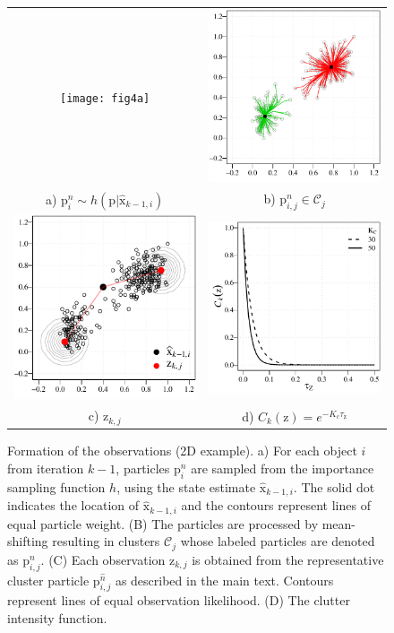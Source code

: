 \begin{figure}
	\centering
	\begin{tabular}{c@{\hspace{2em}}c}
		\texttt{[image: fig4a]} &
		\includegraphics[width=0.4\columnwidth]{fig4b} \\[-1ex]
		a) $\mathrm{p}_{i}^{n} \sim h(\mathrm{p} | \hat{\mathrm{x}}_{k-1,i})$ &
		b) $\mathrm{p}_{i,j}^n \in \mathscr{C}_j$ \\[3ex]
		\includegraphics[width=0.4\columnwidth]{fig4c} &
		\includegraphics[width=0.4\columnwidth]{fig4d} \\[-1ex]
		c) $\mathrm{z}_{k,j}$ &
		d) $C_k(\mathrm{z}) = e^{-K_c\tau_{\mathrm{z}}}$ 
	\end{tabular}
	\caption{Formation of the observations (2D example). a) For each object $i$ from iteration $k-1$, particles $\mathrm{p}_{i}^{n}$ are sampled from the importance sampling function $h$, using the state estimate $\hat{\mathrm{x}}_{k-1,i}$. The solid dot indicates the location of $\hat{\mathrm{x}}_{k-1,i}$ and the contours represent lines of equal particle weight. (B) The particles are processed by mean-shifting resulting in clusters $\mathscr{C}_j$ whose labeled particles are denoted as $\mathrm{p}_{i,j}^{n}$. (C) Each observation $\mathrm{z}_{k,j}$ is obtained from the representative cluster particle $\mathrm{p}_{i,j}^{\hat{n}}$ as described in the main text. Contours represent lines of equal observation likelihood. (D) The clutter intensity function.} 
	\label{fig4}
\end{figure}
